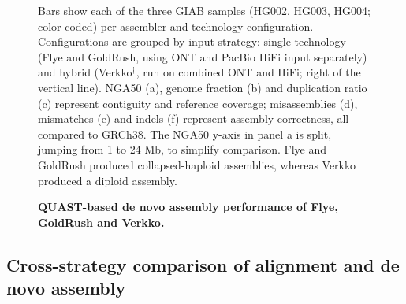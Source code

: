\documentclass[12pt, letterpaper]{article}
\begin{document}
\begin{figure}[!tbp]
    \captionsetup{singlelinecheck=false}
    \caption{
        \textbf{QUAST-based de novo assembly performance of Flye, GoldRush and Verkko.}}
    \label{fig:denovo_assembly_performance}
    \begin{minipage}{\linewidth}\footnotesize\noindent Bars show each of the three GIAB samples (HG002, HG003, HG004; color-coded) per assembler and technology configuration. Configurations are grouped by input strategy: single-technology (Flye and GoldRush, using ONT and PacBio HiFi input separately) and hybrid (Verkko$^\dagger$, run on combined ONT and HiFi; right of the vertical line). NGA50 (a), genome fraction (b) and duplication ratio (c) represent contiguity and reference coverage; misassemblies (d), mismatches (e) and indels (f) represent assembly correctness, all compared to GRCh38. The NGA50 y-axis in panel a is split, jumping from 1 to 24 Mb, to simplify comparison. Flye and GoldRush produced collapsed-haploid assemblies, whereas Verkko produced a diploid assembly.
    \end{minipage}
\end{figure}

\subsection{Cross-strategy comparison of alignment and de novo assembly}
\end{document}
